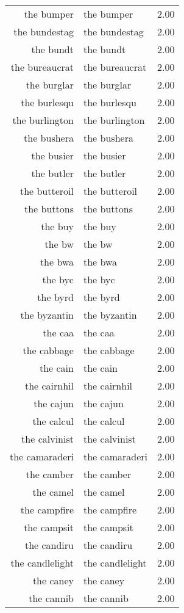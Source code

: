 \begin{table}[ht]
\begin{tabular}{rlr}
  the bumper & the bumper & 2.00 \\ 
  the bundestag & the bundestag & 2.00 \\ 
  the bundt & the bundt & 2.00 \\ 
  the bureaucrat & the bureaucrat & 2.00 \\ 
  the burglar & the burglar & 2.00 \\ 
  the burlesqu & the burlesqu & 2.00 \\ 
  the burlington & the burlington & 2.00 \\ 
  the bushera & the bushera & 2.00 \\ 
  the busier & the busier & 2.00 \\ 
  the butler & the butler & 2.00 \\ 
  the butteroil & the butteroil & 2.00 \\ 
  the buttons & the buttons & 2.00 \\ 
  the buy & the buy & 2.00 \\ 
  the bw & the bw & 2.00 \\ 
  the bwa & the bwa & 2.00 \\ 
  the byc & the byc & 2.00 \\ 
  the byrd & the byrd & 2.00 \\ 
  the byzantin & the byzantin & 2.00 \\ 
  the caa & the caa & 2.00 \\ 
  the cabbage & the cabbage & 2.00 \\ 
  the cain & the cain & 2.00 \\ 
  the cairnhil & the cairnhil & 2.00 \\ 
  the cajun & the cajun & 2.00 \\ 
  the calcul & the calcul & 2.00 \\ 
  the calvinist & the calvinist & 2.00 \\ 
  the camaraderi & the camaraderi & 2.00 \\ 
  the camber & the camber & 2.00 \\ 
  the camel & the camel & 2.00 \\ 
  the campfire & the campfire & 2.00 \\ 
  the campsit & the campsit & 2.00 \\ 
  the candiru & the candiru & 2.00 \\ 
  the candlelight & the candlelight & 2.00 \\ 
  the caney & the caney & 2.00 \\ 
  the cannib & the cannib & 2.00 \\ 

\end{tabular}
\end{table}
